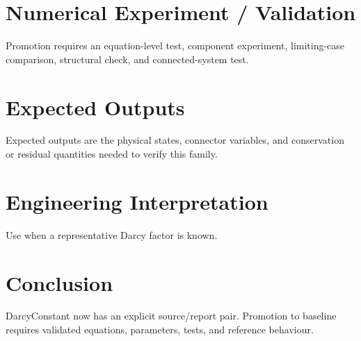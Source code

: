 \documentclass[10pt,a4paper]{article}
\begin{document}
\section{Numerical Experiment / Validation}Promotion requires an equation-level test, component experiment, limiting-case comparison, structural check, and connected-system test.
\section{Expected Outputs}Expected outputs are the physical states, connector variables, and conservation or residual quantities needed to verify this family.
\section{Engineering Interpretation}Use when a representative Darcy factor is known.
\section*{Conclusion}DarcyConstant now has an explicit source/report pair. Promotion to baseline requires validated equations, parameters, tests, and reference behaviour.
\end{document}

